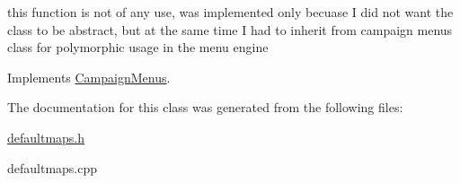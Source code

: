this function is not of any use, was implemented only becuase I did not want the class to be abstract, but at the same time I had to inherit from campaign menus class for polymorphic usage in the menu engine 

Implements \hyperlink{class_campaign_menus}{Campaign\+Menus}.



The documentation for this class was generated from the following files\+:\begin{DoxyCompactItemize}
\item 
\hyperlink{defaultmaps_8h}{defaultmaps.\+h}\item 
defaultmaps.\+cpp\end{DoxyCompactItemize}
